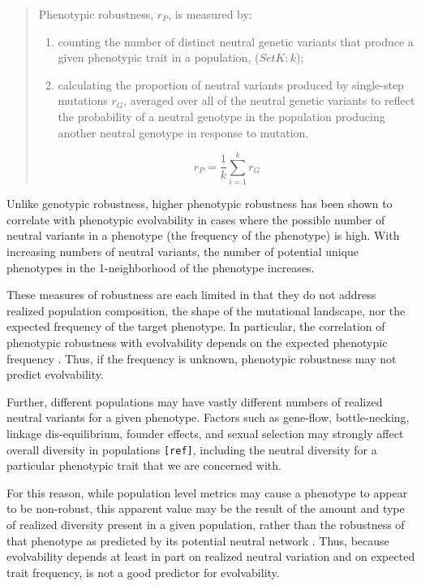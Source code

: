 \begin{quote}
Phenotypic robustness, $r_P$, is measured by:

\begin{enumerate}
\item counting the number of distinct neutral genetic variants that produce a given phenotypic trait in a population, ($Set K: k$);
\item calculating the proportion of neutral variants produced by single-step mutations $r_G$, averaged over all of the neutral genetic variants to reflect the probability of a neutral genotype in the population producing another neutral genotype in response to mutation.
\end{enumerate}
\begin{equation}
r_{P} =  \frac{1}{k} \sum_{i=1}^{k} r_{G} 
\end{equation}
\end{quote}

Unlike genotypic robustness, higher phenotypic robustness has been shown to correlate with phenotypic evolvability\cite{andreas_wagner_robustness_2008} in cases where the possible number of neutral variants in a phenotype (the frequency of the phenotype) is high. With increasing numbers of neutral variants, the number of potential unique phenotypes in the 1-neighborhood of the phenotype increases.

These measures of robustness are each limited in that they do not address realized population composition, the shape of the mutational landscape, nor the expected frequency of the target phenotype. In particular, the correlation of phenotypic robustness with evolvability depends on the expected phenotypic frequency \cite{andreas_wagner_robustness_2008}. Thus, if the frequency is unknown, phenotypic robustness may not predict evolvability.

Further, different populations may have vastly different numbers of realized neutral variants for a given phenotype. \cite{alberch_genes_1991} Factors such as gene-flow, bottle-necking, linkage dis-equilibrium, founder effects, and sexual selection may strongly affect overall diversity in populations \verb|[ref]|, including the neutral diversity for a particular phenotypic trait that we are concerned with.

For this reason, while population level metrics may cause a phenotype to appear to be non-robust, this apparent value may be the result of the amount and type of realized diversity present in a given population, rather than the robustness of that phenotype as predicted by its potential neutral network \cite{alberch_genes_1991}. Thus, because evolvability depends at least in part on realized neutral variation and on expected trait frequency,  is not a good predictor for evolvability.


